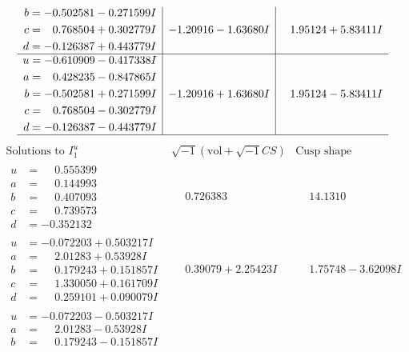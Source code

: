 \documentclass[1p]{elsarticle_modified}
\theoremstyle{definition}
\newcommand{\I}{\sqrt{-1}}
\begin{document}
$$\begin{array}{c|c|c}
\begin{aligned}
b &= -0.502581 - 0.271599 I \\
c &= \phantom{-}0.768504 + 0.302779 I \\
d &= -0.126387 + 0.443779 I\end{aligned}
 & -1.20916 - 1.63680 I & \phantom{-}1.95124 + 5.83411 I \\ \hline\begin{aligned}
u &= -0.610909 - 0.417338 I \\
a &= \phantom{-}0.428235 - 0.847865 I \\
b &= -0.502581 + 0.271599 I \\
c &= \phantom{-}0.768504 - 0.302779 I \\
d &= -0.126387 - 0.443779 I\end{aligned}
 & -1.20916 + 1.63680 I & \phantom{-}1.95124 - 5.83411 I\\
 \hline 
 \end{array}$$\newpage$$\begin{array}{c|c|c}  
\text{Solutions to }I^u_{1}& \I (\text{vol} + \sqrt{-1}CS) & \text{Cusp shape}\\
 \hline 
\begin{aligned}
u &= \phantom{-}0.555399\phantom{ +0.000000I} \\
a &= \phantom{-}0.144993\phantom{ +0.000000I} \\
b &= \phantom{-}0.407093\phantom{ +0.000000I} \\
c &= \phantom{-}0.739573\phantom{ +0.000000I} \\
d &= -0.352132\phantom{ +0.000000I}\end{aligned}
 & \phantom{-}0.726383\phantom{ +0.000000I} & \phantom{-}14.1310\phantom{ +0.000000I} \\ \hline\begin{aligned}
u &= -0.072203 + 0.503217 I \\
a &= \phantom{-}2.01283 + 0.53928 I \\
b &= \phantom{-}0.179243 + 0.151857 I \\
c &= \phantom{-}1.330050 + 0.161709 I \\
d &= \phantom{-}0.259101 + 0.090079 I\end{aligned}
 & \phantom{-}0.39079 + 2.25423 I & \phantom{-}1.75748 - 3.62098 I \\ \hline\begin{aligned}
u &= -0.072203 - 0.503217 I \\
a &= \phantom{-}2.01283 - 0.53928 I \\
b &= \phantom{-}0.179243 - 0.151857 I \\

\end{aligned}
\end{array}$$
\end{document}
